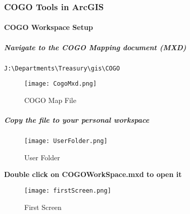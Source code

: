 %
%
%
%
% 
  
\subsubsection[COGO Tools in ArcGIS]{COGO Tools in ArcGIS}
\vspace{.1in}

\paragraph{COGO Workspace Setup}

\subparagraph[The COGO Mapping Document(mxd)]{\textbf{Navigate to the COGO Mapping document (MXD)}}
 \begin{verbatim}
J:\Departments\Treasury\gis\COGO
\end{verbatim}

\begin{figure}[h!]
\centering
    \texttt{[image: CogoMxd.png]}

\caption{COGO Map File}
\end{figure}
%

\subparagraph*{Copy the file to your personal workspace}

\begin{figure}[h!]
\centering
    \texttt{[image: UserFolder.png]}

\caption{User Folder}
\end{figure}
%
\clearpage  

{\textbf{Double click on COGOWorkSpace.mxd to open it}}

\begin{figure}[h!]
\centering
    \texttt{[image: firstScreen.png]}

\caption{First Screen}
\end{figure}
%

